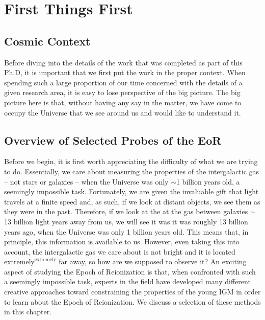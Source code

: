 


\ifpdf
    \graphicspath{{introduction/figures/PNG/}{introduction/figures/PDF/}{introduction/figures/}}
\else
    \graphicspath{{introduction/figures/EPS/}{introduction/figures/}}
\fi

\chapter{First Things First}
\section{Cosmic Context}
Before diving into the details of the work that was completed as part of this Ph.D, it is important that we first put the work in the proper context. When spending such a large proportion of our time concerned with the details of a given research area, it is easy to lose perspective of the big picture. The big picture here is that, without having any say in the matter, we have come to occupy the Universe that we see around us and would like to understand it. 

\section{Overview of Selected Probes of the EoR}

Before we begin, it is first worth appreciating the difficulty of what we are trying to do. Essentially, we care about measuring the properties of the intergalactic gas -- not stars or galaxies -- when the Universe was only $\sim$1 billion years old, a seemingly impossible task. Fortunately, we are given the invaluable gift that light travels at a finite speed and, as such, if we look at distant objects, we see them as they were in the past. Therefore, if we look at the at the gas between galaxies $\sim$13 billion light years away from us, we will see it was it was roughly 13 billion years ago, when the Universe was only 1 billion years old. This means that, in principle, this information is available to us. However, even taking this into account, the intergalactic gas we care about is not bright and it is located $\text{extremely}^{\text{extremely}}$ far away, so how are we supposed to observe it? An exciting aspect of studying the Epoch of Reionization is that, when confronted with such a seemingly impossible task, experts in the field have developed many different creative approaches toward constraining the properties of the young IGM in order to learn about the Epoch of Reionization. We discuss a selection of these methods in this chapter.

